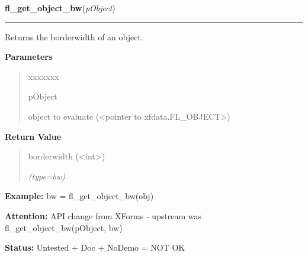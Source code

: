\hspace{.8\funcindent}\begin{boxedminipage}{\funcwidth}

    \raggedright \textbf{fl\_get\_object\_bw}(\textit{pObject})

    \vspace{-1.5ex}

    \rule{\textwidth}{0.5\fboxrule}
\setlength{\parskip}{2ex}
    Returns the borderwidth of an object.

\setlength{\parskip}{1ex}
      \textbf{Parameters}
      \vspace{-1ex}

      \begin{quote}
        \begin{Ventry}{xxxxxxx}

          \item[pObject]

          object to evaluate ({\textless}pointer to 
          xfdata.FL\_OBJECT{\textgreater})

        \end{Ventry}

      \end{quote}

      \textbf{Return Value}
    \vspace{-1ex}

      \begin{quote}
      borderwidth ({\textless}int{\textgreater})

      {\it (type=bw)}

      \end{quote}

\textbf{Example:} bw = fl\_get\_object\_bw(obj)



\textbf{Attention:} API change from XForms - upstream was fl\_get\_object\_bw(pObject, bw)



\textbf{Status:} Untested + Doc + NoDemo = NOT OK



    \end{boxedminipage}

    \label{xformslib:library:fl_set_object_resize}

    \vspace{0.5ex}


